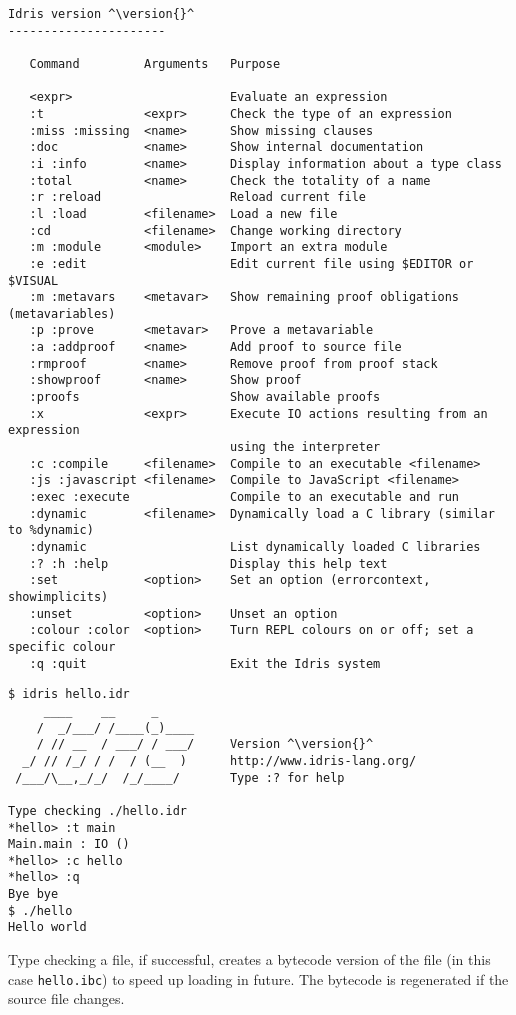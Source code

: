 \begin{lstlisting}[caption={Interactive environment commands}, label=cmds, style=stdout, float=htp]
Idris version ^\version{}^
----------------------

   Command         Arguments   Purpose

   <expr>                      Evaluate an expression
   :t              <expr>      Check the type of an expression
   :miss :missing  <name>      Show missing clauses
   :doc            <name>      Show internal documentation
   :i :info        <name>      Display information about a type class
   :total          <name>      Check the totality of a name
   :r :reload                  Reload current file
   :l :load        <filename>  Load a new file
   :cd             <filename>  Change working directory
   :m :module      <module>    Import an extra module
   :e :edit                    Edit current file using $EDITOR or $VISUAL
   :m :metavars    <metavar>   Show remaining proof obligations (metavariables)
   :p :prove       <metavar>   Prove a metavariable
   :a :addproof    <name>      Add proof to source file
   :rmproof        <name>      Remove proof from proof stack
   :showproof      <name>      Show proof
   :proofs                     Show available proofs
   :x              <expr>      Execute IO actions resulting from an expression
                               using the interpreter
   :c :compile     <filename>  Compile to an executable <filename>
   :js :javascript <filename>  Compile to JavaScript <filename>
   :exec :execute              Compile to an executable and run
   :dynamic        <filename>  Dynamically load a C library (similar to %dynamic)
   :dynamic                    List dynamically loaded C libraries
   :? :h :help                 Display this help text
   :set            <option>    Set an option (errorcontext, showimplicits)
   :unset          <option>    Unset an option
   :colour :color  <option>    Turn REPL colours on or off; set a specific colour
   :q :quit                    Exit the Idris system
\end{lstlisting}

\begin{lstlisting}[caption={Sample Interactive Run}, label=run1, style=stdout, float=htp]
$ idris hello.idr
     ____    __     _
    /  _/___/ /____(_)____
    / // __  / ___/ / ___/     Version ^\version{}^
  _/ // /_/ / /  / (__  )      http://www.idris-lang.org/
 /___/\__,_/_/  /_/____/       Type :? for help

Type checking ./hello.idr
*hello> :t main
Main.main : IO ()
*hello> :c hello
*hello> :q
Bye bye
$ ./hello
Hello world
\end{lstlisting}

\noindent
Type checking a file, if successful, creates a bytecode version of the file (in this case \texttt{hello.ibc}) to speed up loading in future.
The bytecode is regenerated if the source file changes.
